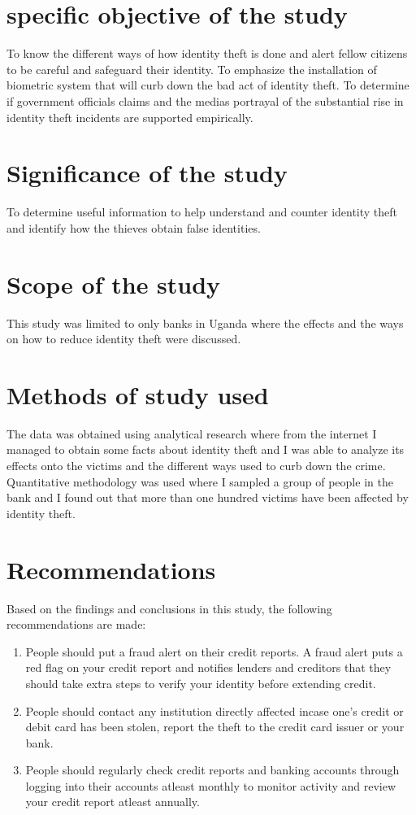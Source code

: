 \documentclass[12pt,]{article}
\begin{document}
\section{specific objective of the study}

To know the different ways of how identity theft is done and alert fellow citizens to be careful and safeguard their identity.
To emphasize the installation of biometric system that will curb down the bad act of identity theft.
To determine if government officials claims and the medias portrayal of the substantial rise in identity theft incidents are supported empirically.


\section{Significance of the study}
To determine useful information to help understand and counter identity theft and identify how the thieves obtain false identities.
\section{Scope of the study}
This study was limited to only banks in Uganda where the effects and the ways on how to reduce identity theft were discussed.

\section{Methods of study used }
The data was obtained using analytical research where from the internet I managed to obtain some facts about identity theft and I was able to analyze its effects onto the victims and the different ways used to curb down the crime.
Quantitative methodology was used where I sampled a group of people in the bank and I found out that more than one hundred victims have been affected by identity theft.

\section{Recommendations }
Based on the findings and conclusions in this study, the following recommendations are made:

\begin{enumerate}

\item People should put a fraud alert on their credit reports. A fraud alert puts a red flag on your credit report and notifies lenders and creditors that they should take extra steps to verify your identity before extending credit.

\item People should contact any institution directly affected incase one’s credit or debit card has been stolen, report the theft to the credit card issuer or your bank.

\item People should regularly check credit reports and banking accounts through logging into their accounts atleast monthly to monitor activity and review your credit report atleast annually.
\end{enumerate}
\end{document}
